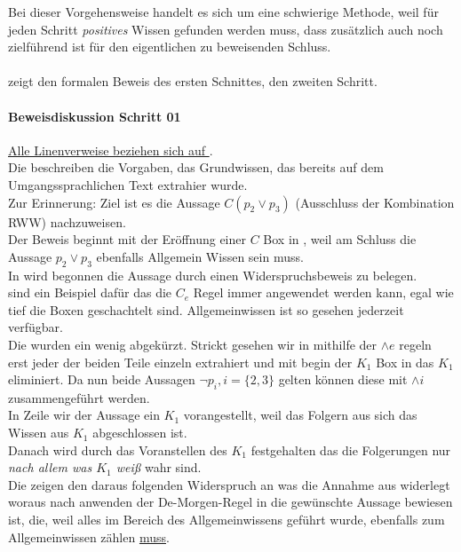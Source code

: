 Bei dieser Vorgehensweise handelt es sich um eine schwierige Methode, weil für jeden Schritt \emph{positives} Wissen gefunden werden muss, dass zusätzlich auch noch zielführend ist für den eigentlichen zu beweisenden Schluss.\\\\


 zeigt den formalen Beweis des ersten Schnittes,  den zweiten Schritt.


\paragraph{Beweisdiskussion \WMR Schritt 01}
\underline{Alle Linenverweise beziehen sich auf }.\\
Die  beschreiben die Vorgaben, das Grundwissen, das bereits auf dem Umgangssprachlichen Text extrahier wurde.\\
Zur Erinnerung: Ziel ist es die Aussage $C(p_2 \vee p_3)$ (Ausschluss der Kombination RWW) nachzuweisen.\\
Der Beweis beginnt mit der Eröffnung einer $C$ Box in , weil am Schluss die Aussage $p_2 \vee p_3$ ebenfalls Allgemein Wissen sein muss.\\
In  wird begonnen die Aussage durch einen Widerspruchsbeweis zu belegen.\\
 sind ein Beispiel dafür das die $C_e$ Regel immer angewendet werden kann, egal wie tief die Boxen geschachtelt sind.
Allgemeinwissen ist so gesehen jederzeit verfügbar.\\
Die  wurden ein wenig abgekürzt.
Strickt gesehen wir in  mithilfe der $\wedge e$ regeln erst jeder der beiden Teile einzeln extrahiert und mit begin der $K_1$ Box in  das $K_1$ eliminiert.
Da nun beide Aussagen $\neg p_i, i=\{2,3\}$ gelten können diese mit $\wedge i$ zusammengeführt werden.\\
In Zeile  wir der Aussage ein $K_1$ vorangestellt, weil das Folgern aus sich das Wissen aus $K_1$ abgeschlossen ist.\\
Danach wird durch das Voranstellen des $K_1$ festgehalten das die Folgerungen nur \emph{nach allem was $K_1$ weiß} wahr sind.\\
Die  zeigen den daraus folgenden Widerspruch an was die Annahme aus  widerlegt woraus nach anwenden der De-Morgen-Regel in  die gewünschte Aussage bewiesen ist, die, weil alles im Bereich des Allgemeinwissens geführt wurde, ebenfalls zum Allgemeinwissen zählen \underline{muss}.


